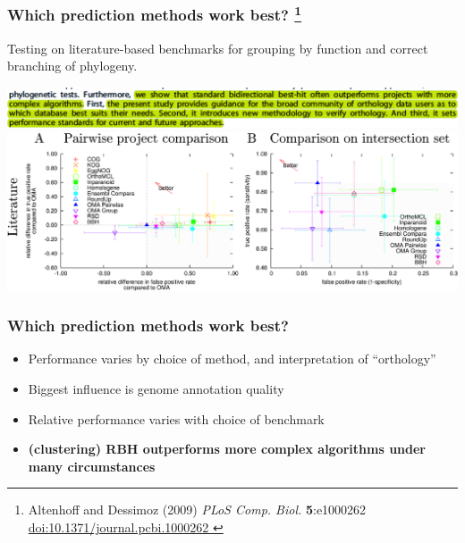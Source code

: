 \begin{frame}
  \frametitle{Which prediction methods work best?
    \footnote{\tiny{Altenhoff and Dessimoz (2009) \textit{PLoS Comp. Biol.} \textbf{5}:e1000262 \href{http://dx.doi.org/10.1371/journal.pcbi.1000262}{doi:10.1371/journal.pcbi.1000262
    }}}
  }
  Testing on literature-based benchmarks for grouping by function and correct branching of phylogeny.  \begin{center}
      \includegraphics[width=1\textwidth]{images/altenhoff1} \\
      \includegraphics[width=1\textwidth]{images/altenhoff2}      
  \end{center}
\end{frame}

\begin{frame}
  \frametitle{Which prediction methods work best?}
  \begin{itemize}
    \item \textcolor{hutton_green}{Performance varies by choice of method, and interpretation of ``orthology''}
    \item \textcolor{hutton_blue}{Biggest influence is genome annotation quality}
    \item Relative performance varies with choice of benchmark
    \item \textcolor{hutton_purple}{\textbf{(clustering) RBH outperforms more complex algorithms under many circumstances}}
  \end{itemize}
\end{frame}

